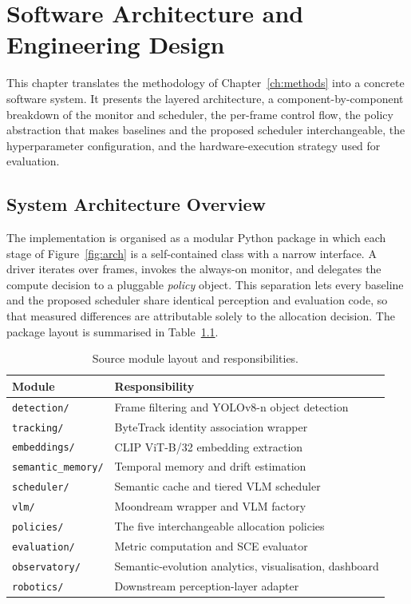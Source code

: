 \chapter{Software Architecture and Engineering Design}
\label{ch:architecture}

\begin{chapterabstract}
This chapter translates the methodology of Chapter~\ref{ch:methods} into a
concrete software system. It presents the layered architecture, a
component-by-component breakdown of the monitor and scheduler, the per-frame
control flow, the policy abstraction that makes baselines and the proposed
scheduler interchangeable, the hyperparameter configuration, and the
hardware-execution strategy used for evaluation.
\end{chapterabstract}

\section{System Architecture Overview}
\label{sec:arch-overview}

The implementation is organised as a modular Python package in which each
stage of Figure~\ref{fig:arch} is a self-contained class with a narrow
interface. A driver iterates over frames, invokes the always-on monitor, and
delegates the compute decision to a pluggable \emph{policy} object. This
separation lets every baseline and the proposed scheduler share identical
perception and evaluation code, so that measured differences are attributable
solely to the allocation decision. The package layout is summarised in
Table~\ref{tab:modules}.

\begin{table}[htbp]
\centering
\caption[Source module layout]{Source module layout and responsibilities.}
\label{tab:modules}
\small
\begin{tabular}{@{}ll@{}}
\toprule
\textbf{Module} & \textbf{Responsibility} \\
\midrule
\texttt{detection/}      & Frame filtering and YOLOv8-n object detection \\
\texttt{tracking/}       & ByteTrack identity association wrapper \\
\texttt{embeddings/}     & CLIP ViT-B/32 embedding extraction \\
\texttt{semantic\_memory/} & Temporal memory and drift estimation \\
\texttt{scheduler/}      & Semantic cache and tiered VLM scheduler \\
\texttt{vlm/}            & Moondream wrapper and VLM factory \\
\texttt{policies/}       & The five interchangeable allocation policies \\
\texttt{evaluation/}     & Metric computation and SCE evaluator \\
\texttt{observatory/}    & Semantic-evolution analytics, visualisation, dashboard \\
\texttt{robotics/}       & Downstream perception-layer adapter \\
\bottomrule
\end{tabular}
\end{table}

